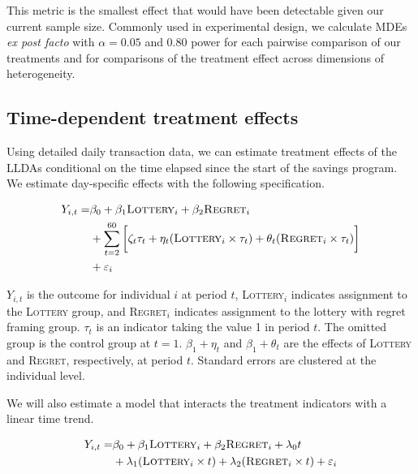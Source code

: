 \documentclass[12pt]{article}
\begin{document}
		This metric is the smallest effect that would have been detectable given our current sample size. Commonly used in experimental design, we calculate MDEs \textit{ex post facto} with $\alpha = 0.05$ and 0.80 power for each pairwise comparison of our treatments and for comparisons of the treatment effect across dimensions of heterogeneity.


	\subsection{Time-dependent treatment effects}

		Using detailed daily transaction data, we can estimate treatment effects of the LLDAs conditional on the time elapsed since the start of the savings program. We estimate day-specific effects with the following specification.

		\begin{equation} \begin{split}
		Y_{i,t} = & \beta_{0} + \beta_{1}\text{\textsc{Lottery}}_{i} + \beta_{2}\text{\textsc{Regret}}_{i} \\
					& + \sum_{t=2}^{60} \bigg [ \zeta_{t} \tau_{t} + \eta_{t}(\text{\textsc{Lottery}}_{i} \times \tau_{t}) + \theta_{t}(\text{\textsc{Regret}}_{i} \times \tau_{t}) \bigg ] \\
					& + \varepsilon_{i}
		\end{split} \label{eq:timedummy} \end{equation}

		$Y_{i, t}$ is the outcome for individual $i$ at period $t$, \textsc{Lottery}$_i$ indicates assignment to the \textsc{Lottery} group, and \textsc{Regret}$_i$ indicates assignment to the lottery with regret framing group. $\tau_t$ is an indicator taking the value 1 in period $t$. The omitted group is the control group at $t=1$. $\beta_1 + \eta_t$ and $\beta_1 + \theta_t$ are the effects of \textsc{Lottery} and \textsc{Regret}, respectively, at period $t$. Standard errors are clustered at the individual level.

		We will also estimate a model that interacts the treatment indicators with a linear time trend.

		\begin{equation} \begin{split}
		Y_{i,t} = & \beta_{0} + \beta_{1}\text{\textsc{Lottery}}_{i} + \beta_{2}\text{\textsc{Regret}}_{i} + \lambda_{0}t \\
					& + \lambda_{1}(\text{\textsc{Lottery}}_{i} \times t) + \lambda_{2}(\text{\textsc{Regret}}_{i} \times t) + \varepsilon_{i}
		\end{split} \label{eq:timelinear} \end{equation}
\end{document}
